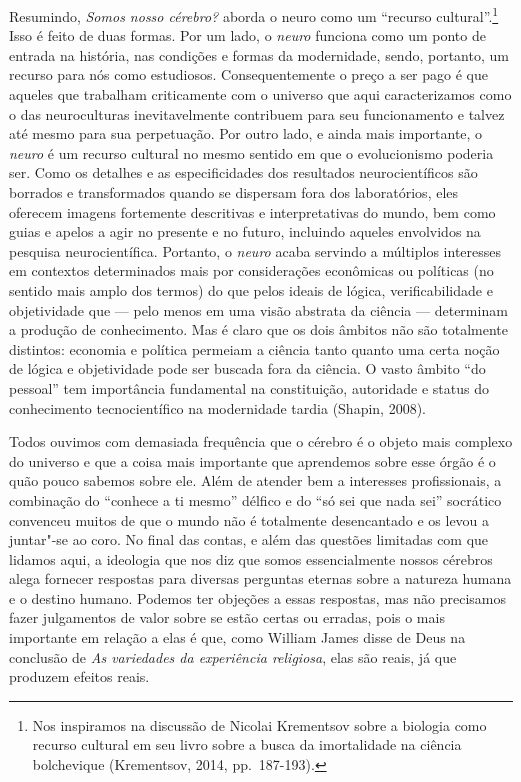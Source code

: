 Resumindo, \emph{Somos nosso cérebro?} aborda o neuro como um ``recurso
cultural''.\footnote[9]{Nos inspiramos na discussão de Nicolai Krementsov sobre a biologia
como recurso cultural em seu livro sobre a busca da imortalidade na
ciência bolchevique (Krementsov, 2014, pp.~187-193).} Isso é feito de duas formas. Por um lado,
o \emph{neuro} funciona como um ponto de entrada na história, nas
condições e formas da modernidade, sendo, portanto, um recurso para nós
como estudiosos. Consequentemente o preço a ser pago é que aqueles que
trabalham criticamente com o universo que aqui caracterizamos como o das
neuroculturas inevitavelmente contribuem para seu funcionamento e talvez
até mesmo para sua perpetuação. Por outro lado, e ainda mais importante,
o \emph{neuro} é um recurso cultural no mesmo sentido em que o
evolucionismo poderia ser. Como os detalhes e as especificidades dos
resultados neurocientíficos são borrados e transformados quando se
dispersam fora dos laboratórios, eles oferecem imagens fortemente
descritivas e interpretativas do mundo, bem como guias e apelos a agir
no presente e no futuro, incluindo aqueles envolvidos na pesquisa
neurocientífica. Portanto, o \emph{neuro} acaba servindo a múltiplos
interesses em contextos determinados mais por considerações econômicas
ou políticas (no sentido mais amplo dos termos) do que pelos ideais de
lógica, verificabilidade e objetividade que --- pelo menos em uma visão
abstrata da ciência --- determinam a produção de conhecimento. Mas é
claro que os dois âmbitos não são totalmente distintos: economia e
política permeiam a ciência tanto quanto uma certa noção de lógica e
objetividade pode ser buscada fora da ciência. O vasto âmbito ``do
pessoal'' tem importância fundamental na constituição, autoridade e
status do conhecimento tecnocientífico na modernidade tardia (Shapin,
2008).

Todos ouvimos com demasiada frequência que o cérebro é o objeto mais
complexo do universo e que a coisa mais importante que aprendemos sobre
esse órgão é o quão pouco sabemos sobre ele. Além de atender bem a
interesses profissionais, a combinação do ``conhece a ti mesmo'' délfico
e do ``só sei que nada sei'' socrático convenceu muitos de que o mundo
não é totalmente desencantado e os levou a juntar"-se ao coro. No final
das contas, e além das questões limitadas com que lidamos aqui, a
ideologia que nos diz que somos essencialmente nossos cérebros alega
fornecer respostas para diversas perguntas eternas sobre a natureza
humana e o destino humano. Podemos ter objeções a essas respostas, mas
não precisamos fazer julgamentos de valor sobre se estão certas ou
erradas, pois o mais importante em relação a elas é que, como William
James disse de Deus na conclusão de \emph{As variedades da experiência
religiosa}, elas são reais, já que produzem efeitos reais.

